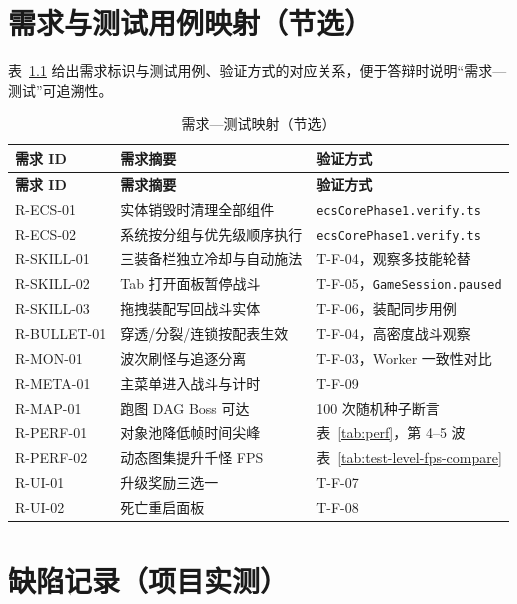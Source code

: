 \chapter{需求与测试用例映射（节选）}
\label{app:req-test}

表~\ref{tab:req-test-matrix} 给出需求标识与测试用例、验证方式的对应关系，便于答辩时说明“需求—测试”可追溯性。

\begin{longtable}{p{2.2cm}p{4.2cm}p{6.8cm}}
  \caption{需求—测试映射（节选）} \label{tab:req-test-matrix} \\
  \toprule
  \textbf{需求 ID} & \textbf{需求摘要} & \textbf{验证方式} \\
  \midrule
  \endfirsthead
  \toprule
  \textbf{需求 ID} & \textbf{需求摘要} & \textbf{验证方式} \\
  \midrule
  \endhead
  R-ECS-01 & 实体销毁时清理全部组件 & \texttt{ecsCorePhase1.verify.ts} \\
  R-ECS-02 & 系统按分组与优先级顺序执行 & \texttt{ecsCorePhase1.verify.ts} \\
  R-SKILL-01 & 三装备栏独立冷却与自动施法 & T-F-04，观察多技能轮替 \\
  R-SKILL-02 & Tab 打开面板暂停战斗 & T-F-05，\texttt{GameSession.paused} \\
  R-SKILL-03 & 拖拽装配写回战斗实体 & T-F-06，装配同步用例 \\
  R-BULLET-01 & 穿透/分裂/连锁按配表生效 & T-F-04，高密度战斗观察 \\
  R-MON-01 & 波次刷怪与追逐分离 & T-F-03，Worker 一致性对比 \\
  R-META-01 & 主菜单进入战斗与计时 & T-F-09 \\
  R-MAP-01 & 跑图 DAG Boss 可达 & 100 次随机种子断言 \\
  R-PERF-01 & 对象池降低帧时间尖峰 & 表~\ref{tab:perf}，第 4--5 波 \\
  R-PERF-02 & 动态图集提升千怪 FPS & 表~\ref{tab:test-level-fps-compare} \\
  R-UI-01 & 升级奖励三选一 & T-F-07 \\
  R-UI-02 & 死亡重启面板 & T-F-08 \\
  \bottomrule
\end{longtable}

\chapter{缺陷记录（项目实测）}
\label{app:bugs}

